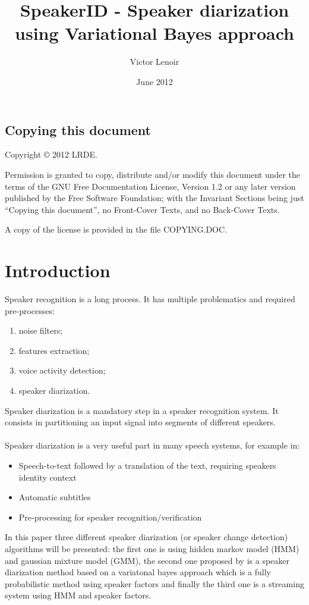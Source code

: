 \documentclass{techrep} %
\title{SpeakerID - Speaker diarization using Variational Bayes approach}
\author{Victor Lenoir} \revision$LastChangedRevision: 2340 $
\date{June 2012} \email{lenoir@lrde.epita.fr}
\begin{document}
\section*{Copying this document}
Copyright \copyright{} 2012 LRDE.

Permission is granted to copy, distribute and/or modify this document under
the terms of the GNU Free Documentation License, Version 1.2 or any later
version published by the Free Software Foundation; with the Invariant Sections
being just ``Copying this document'', no Front-Cover Texts, and no Back-Cover
Texts.

A copy of the license is provided in the file COPYING.DOC.

\tableofcontents

\newpage
\chapter{Introduction}

Speaker recognition is a long process. It has multiple problematics
and required pre-processes:
\begin{enumerate}
\item noise filters;
\item features extraction;
\item voice activity detection;
\item speaker diarization.
\end{enumerate}

Speaker diarization is a mandatory step in a speaker recognition
system.  It consists in partitioning an input signal into segments of
different speakers.\\\\ Speaker diarization is a very useful part in
many speech systems, for example in:
\begin{itemize}
\item Speech-to-text followed by a translation of the text, requiring
  speakers identity context
\item Automatic subtitles
\item Pre-processing for speaker recognition/verification
\end{itemize}

In this paper three different speaker diarization (or speaker change
detection) algorithms will be presented: the first one is using hidden
markov model (HMM) and gaussian mixture model (GMM), the second one
proposed by \cite{DIAFACT} is a speaker diarization method based on a
variatonal bayes approach which is a fully probabilistic method using
speaker factors and finally the third one is a streaming system using
HMM and speaker factors.
\end{document}
